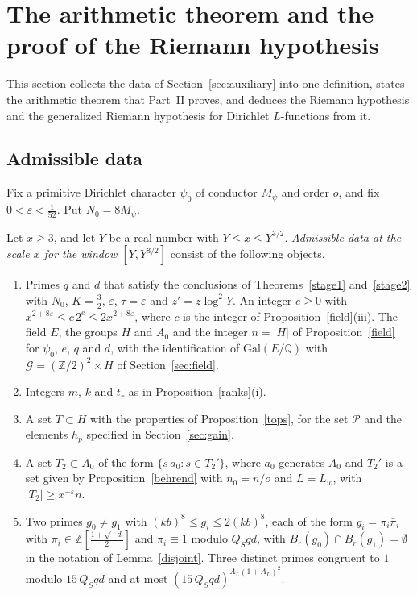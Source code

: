 \section{The arithmetic theorem and the proof of the Riemann hypothesis}\label{sec:reduction}

This section collects the data of Section~\ref{sec:auxiliary} into one definition, states the arithmetic theorem that Part~II proves, and deduces the Riemann hypothesis and the generalized Riemann hypothesis for Dirichlet $L$-functions from it.

\subsection{Admissible data}

Fix a primitive Dirichlet character $\psi_0$ of conductor $M_\psi$ and order $o$, and fix $0<\varepsilon<\frac1{52}$. Put $N_0=8M_\psi$.

\begin{definition}\label{def:admissible}
Let $x\ge3$, and let $Y$ be a real number with $Y\le x\le Y^{3/2}$. \emph{Admissible data at the scale $x$ for the window $[Y,Y^{3/2}]$} consist of the following objects.
\begin{enumerate}
\item[(D1)] Primes $q$ and $d$ that satisfy the conclusions of Theorems~\ref{stage1} and~\ref{stage2} with $N_0$, $K=\frac32$, $\varepsilon$, $\tau=\varepsilon$ and $z'=z\log^2Y$. An integer $e\ge0$ with $x^{2+8\varepsilon}\le c\,2^e\le2x^{2+8\varepsilon}$, where $c$ is the integer of Proposition~\ref{field}(iii). The field $E$, the groups $H$ and $A_0$ and the integer $n=\lvert H\rvert$ of Proposition~\ref{field} for $\psi_0$, $e$, $q$ and $d$, with the identification of $\mathrm{Gal}(E/\mathbb Q)$ with $\mathcal G=(\mathbb Z/2)^2\times H$ of Section~\ref{sec:field}.
\item[(D2)] Integers $m$, $k$ and $t_r$ as in Proposition~\ref{ranks}(i).
\item[(D3)] A set $T\subset H$ with the properties of Proposition~\ref{tops}, for the set $\mathcal P$ and the elements $h_p$ specified in Section~\ref{sec:gain}.
\item[(D4)] A set $T_2\subset A_0$ of the form $\{s\,a_0:s\in T_2'\}$, where $a_0$ generates $A_0$ and $T_2'$ is a set given by Proposition~\ref{behrend} with $n_0=n/o$ and $L=L_w$, with $\lvert T_2\rvert\ge x^{-\varepsilon}n$.
\item[(D5)] Two primes $g_0\ne g_1$ with $(kb)^8\le g_i\le2(kb)^8$, each of the form $g_i=\pi_i\bar\pi_i$ with $\pi_i\in\mathbb Z[\frac{1+\sqrt{-d}}2]$ and $\pi_i\equiv1$ modulo $Q_Sqd$, with $B_r(g_0)\cap B_r(g_1)=\emptyset$ in the notation of Lemma~\ref{disjoint}. Three distinct primes congruent to $1$ modulo $15\,Q_Sqd$ and at most $(15\,Q_Sqd)^{A_L(1+A_L)^2}$.
\end{enumerate}
\end{definition}


